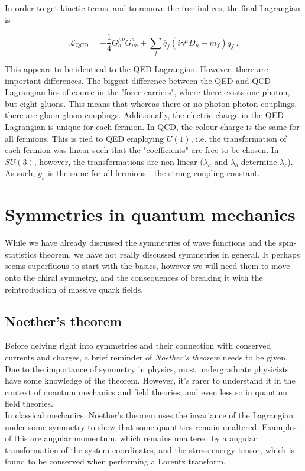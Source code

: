 \documentclass[10pt,twoside]{report}
\begin{document}
	In order to get kinetic terms, and to remove the free indices, the final Lagrangian is
	
	\begin{equation}
	\mathcal{L}_{\text{QCD}} = -\frac{1}{4}G_a^{\mu\nu}G_{\mu\nu}^a + \sum_f \bar{q}_f(i\gamma^\mu D_\mu - m_f)q_f\:.
	\end{equation}
	
	This appears to be identical to the QED Lagrangian. However, there are important differences. The biggest difference between the QED and QCD Lagrangian lies of course in the "force carriers", where there exists one photon, but eight gluons. This means that whereas there or no photon-photon couplings, there are gluon-gluon couplings. Additionally, the electric charge in the QED Lagrangian is unique for each fermion. In QCD, the colour charge is the same for all fermions. This is tied to QED employing $U(1)$, i.e. the transformation of each fermion was linear such that the "coefficients" are free to be chosen. In $SU(3)$, however, the transformations are non-linear ($\lambda_a$ and $\lambda_b$ determine $\lambda_c$). As such, $g_s$ is the same for all fermions - the strong coupling constant.
	
	\section{Symmetries in quantum mechanics}
	While we have already discussed the symmetries of wave functions and the spin-statistics theorem, we have not really discussed symmetries in general. It perhaps seems superfluous to start with the basics, however we will need them to move onto the chiral symmetry, and the consequences of breaking it with the reintroduction of massive quark fields.
	
	\subsection{Noether's theorem}
	Before delving right into symmetries and their connection with conserved currents and charges, a brief reminder of \emph{Noether's theorem} needs to be given. Due to the importance of symmetry in physics, most undergraduate physicists have some knowledge of the theorem. However, it's rarer to understand it in the context of quantum mechanics and field theories, and even less so in quantum field theories.\\
	
	In classical mechanics, Noether's theorem uses the invariance of the Lagrangian under some symmetry to show that some quantities remain unaltered. Examples of this are angular momentum, which remains unaltered by a angular transformation of the system coordinates, and the stress-energy tensor, which is found to be conserved when performing a Lorentz transform.\\
	
\end{document}
